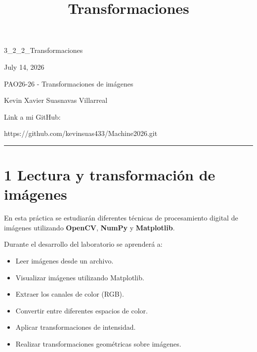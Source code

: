 \documentclass[11pt]{article}
\title{Transformaciones}
\providecommand{\tightlist}{%
      \setlength{\itemsep}{0pt}\setlength{\parskip}{0pt}}
\begin{document}
    
    \maketitle
    
    

    
    3\_2\_2\_Transformaciones

July 14, 2026

PAO26-26 - Transformaciones de imágenes

Kevin Xavier Suasnavas Villarreal

Link a mi GitHub:

https://github.com/kevinsuas433/Machine2026.git

\begin{center}\rule{0.5\linewidth}{0.5pt}\end{center}

\section{1 Lectura y transformación de
imágenes}\label{lectura-y-transformaciuxf3n-de-imuxe1genes}

En esta práctica se estudiarán diferentes técnicas de procesamiento
digital de imágenes utilizando \textbf{OpenCV}, \textbf{NumPy} y
\textbf{Matplotlib}.

Durante el desarrollo del laboratorio se aprenderá a:

\begin{itemize}
\tightlist
\item
  Leer imágenes desde un archivo.
\item
  Visualizar imágenes utilizando Matplotlib.
\item
  Extraer los canales de color (RGB).
\item
  Convertir entre diferentes espacios de color.
\item
  Aplicar transformaciones de intensidad.
\item
  Realizar transformaciones geométricas sobre imágenes.
\end{itemize}
\end{document}
